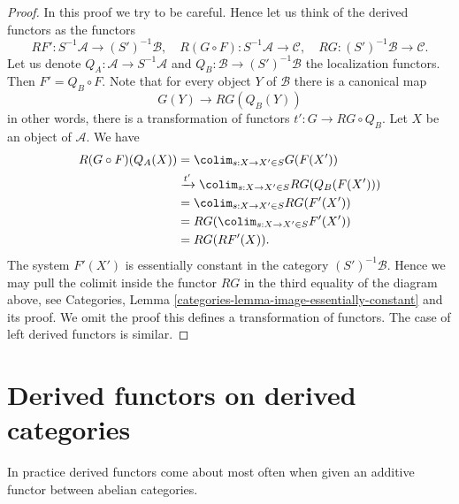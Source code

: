 \begin{proof}
In this proof we try to be careful. Hence let us think of
the derived functors as the functors
$$
RF' : S^{-1}\mathcal{A} \to (S')^{-1}\mathcal{B}, \quad
R(G \circ F) : S^{-1}\mathcal{A} \to \mathcal{C}, \quad
RG : (S')^{-1}\mathcal{B} \to \mathcal{C}.
$$
Let us denote
$Q_A : \mathcal{A} \to S^{-1}\mathcal{A}$ and
$Q_B : \mathcal{B} \to (S')^{-1}\mathcal{B}$
the localization functors. Then $F' = Q_B \circ F$. Note that for
every object $Y$ of $\mathcal{B}$ there is a canonical map
$$
G(Y) \longrightarrow RG(Q_B(Y))
$$
in other words, there is a transformation of functors
$t' : G \to RG \circ Q_B$. Let $X$ be an object of $\mathcal{A}$.
We have
\begin{align*}
R(G \circ F)(Q_A(X))
& = \colim_{s : X \to X' \in S} G(F(X')) \\
& \xrightarrow{t'} \colim_{s : X \to X' \in S} RG(Q_B(F(X'))) \\
& = \colim_{s : X \to X' \in S} RG(F'(X')) \\
& = RG(\colim_{s : X \to X' \in S} F'(X')) \\
& = RG(RF'(X)).
\end{align*}
The system $F'(X')$ is essentially constant in the category
$(S')^{-1}\mathcal{B}$. Hence we may pull the colimit inside the
functor $RG$ in the third equality of the diagram above, see
Categories, Lemma \ref{categories-lemma-image-essentially-constant}
and its proof. We omit the proof this defines a transformation
of functors. The case of left derived functors is similar.
\end{proof}




\section{Derived functors on derived categories}
\label{section-derived-functors-classical}

\noindent
In practice derived functors come about most often when given an
additive functor between abelian categories.

